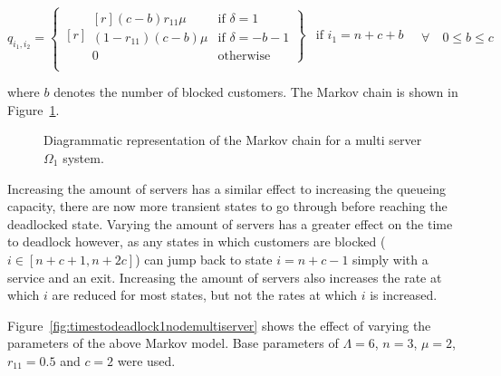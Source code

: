 \documentclass{article}
\begin{document}
\begin{equation}
  q_{i_1, i_2} = \left\{
  \begin{matrix*}[ r ]
    \left. \begin{matrix*}[ r ]
      (c-b)r_{11}\mu & \text{if } \delta = 1 \\
      (1-r_{11})(c-b)\mu & \text{if } \delta = -b-1\\
      0 & \text{otherwise}
    \end{matrix*} \right\} & \text{if } i_1 = n + c + b \\
  \end{matrix*} \right.
  \quad \forall \quad 0 \leq b \leq c
\end{equation}

where $b$ denotes the number of blocked customers.
The Markov chain is shown in Figure~\ref{fig:1nodeMCms}.

\begin{figure}[!htbp]
    
    \caption{Diagrammatic representation of the Markov chain for a multi server $\Omega_1$ system.}
    \label{fig:1nodeMCms}
\end{figure}

Increasing the amount of servers has a similar effect to increasing the queueing capacity, there are now more transient states to go through before reaching the deadlocked state.
Varying the amount of servers has a greater effect on the time to deadlock however, as any states in which customers are blocked ($i \in [n+c+1, n+2c]$) can jump back to state $i=n+c-1$ simply with a service and an exit.
Increasing the amount of servers also increases the rate at which $i$ are reduced for most states, but not the rates at which $i$ is increased.

Figure~\ref{fig:timestodeadlock1nodemultiserver} shows the effect of varying the parameters of the above Markov model.
Base parameters of $\Lambda = 6$, $n = 3$, $\mu = 2$, $r_{11} = 0.5$ and $c = 2$ were used.
\end{document}
